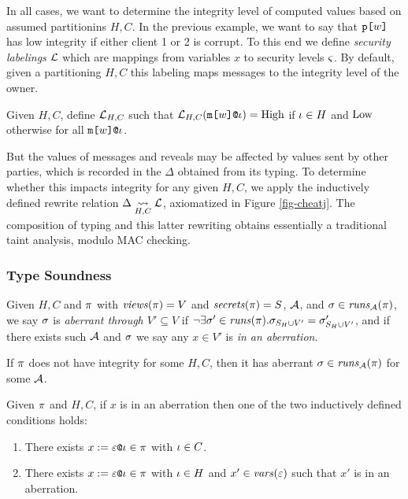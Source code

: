 In all cases, we want to determine the integrity level of computed
values based on assumed partitionins $H,C$. In the previous example,
we want to say that $\texttt{p[}w\texttt{]}$ has low integrity if either client 1 or
2 is corrupt.  To this end we define \emph{security labelings}
$\mathcal{L}$ which are mappings from variables $x$ to security levels
$\varsigma$. By default, given a partitioning $H,C$ this labeling maps
messages to the integrity level of the owner.
\begin{definition}  
  Given $H,C$,
  define $\mathcal{L}_{H,C}$ such that $\mathcal{L}_{H,C}(\texttt{m[}w\texttt{]}\texttt{@}\iota ) = \mathrm{High}$
  if $\iota \in H$  and $\mathrm{Low}$
  otherwise for all $\texttt{m[}w\texttt{]}\texttt{@}\iota$.
\end{definition}
But the values of messages and reveals may be
affected by values sent by other parties, which is
recorded in the $\Delta$ obtained from its typing. To determine
whether this impacts integrity for any given $H,C$, we apply
the inductively defined rewrite relation $\Delta \underset{H,C}{\leadsto} \mathcal{L}$,
axiomatized in Figure \ref{fig-cheatj}. The composition
of typing and this latter rewriting obtains essentially
a traditional taint analysis, modulo MAC checking. 

\subsubsection{Type Soundness}

\begin{definition}
  Given $H,C$ and $\pi$ with $\mathit{views}(\pi) = V$ and $\mathit{secrets}(\pi) = S$,
  $\mathcal{A}$, and $\sigma \in \mathit{runs}_{\mathcal{A}}(\pi)$, we say $\sigma$ is
  \emph{aberrant through $V' \subseteq V$} if $\neg\exists \sigma' \in \mathit{runs}(\pi) .
  \sigma_{S_H \cup V'} = \sigma'_{S_H \cup V'}$, and if there exists
  such $\mathcal{A}$ and $\sigma$ we say any
  $x \in V'$ is \emph{in an aberration}.
\end{definition}

\begin{lemma}
  If $\pi$ does not have integrity for some $H,C$, then it has
  aberrant $\sigma \in \mathit{runs}_{\mathcal{A}}(\pi)$ for some $\mathcal{A}$. 
\end{lemma}

\begin{lemma}
  Given $\pi$ and $H,C$, if $x$ is in an aberration then one of
  the two inductively defined conditions holds:
  \begin{enumerate}[\hspace{5mm}i.]
  \item There exists $x := \varepsilon\texttt{@}\iota \in \pi$ with $\iota \in C$.
  \item There exists $x := \varepsilon\texttt{@}\iota \in \pi$ with $\iota \in H$ and
    $x' \in \mathit{vars}(\varepsilon)$ such that $x'$ is in an aberration.
  \end{enumerate}
\end{lemma}

